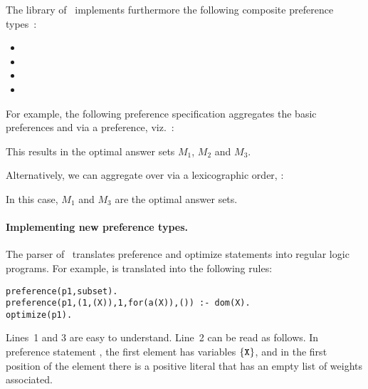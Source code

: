 The library of \asprin\ implements furthermore the following composite preference types~\cite{sonpon06a}: 
\begin{itemize}
\item {}
\item {}
\item {}
\item {}
\end{itemize}

For example, 
the following preference specification 
aggregates the basic preferences  and 
via a  preference, viz.~: 
%

%
This results in the optimal answer sets $M_1$, $M_2$ and $M_3$.

Alternatively,
we can aggregate  over 
via a lexicographic order, :

In this case, $M_1$ and $M_3$ are the optimal answer sets.

\paragraph{Implementing new preference types.}

The parser of \asprin\ translates preference and optimize statements into regular logic programs.  
For example, 
is translated into the following rules:
\begin{lstlisting}
preference(p1,subset).
preference(p1,(1,(X)),1,for(a(X)),()) :- dom(X).
optimize(p1).
\end{lstlisting}
Lines~1 and 3 are easy to understand. 
Line~2 can be read as follows.
In preference statement , the first element has variables $\{\texttt{X}\}$,  
and in the first position of the element there is a positive literal   that has an empty list of weights associated. 

